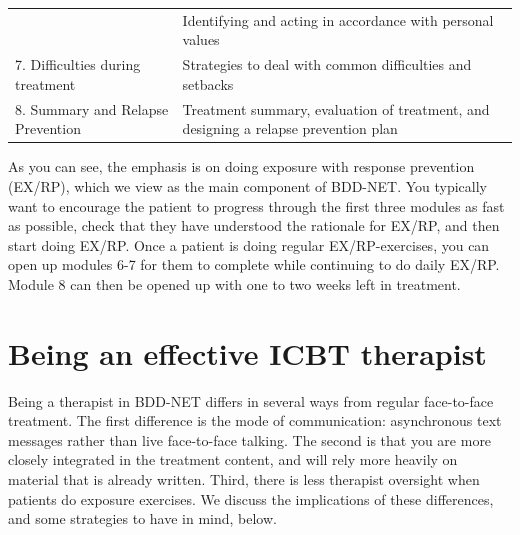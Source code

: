 \documentclass[]{book}
\theoremstyle{definition}
\theoremstyle{definition}
\theoremstyle{definition}
\theoremstyle{remark}
\begin{document}
\begin{longtable}[]{@{}ll@{}}
\begin{minipage}[t]{0.47\columnwidth}
\end{minipage} & \begin{minipage}[t]{0.47\columnwidth}\raggedright
Identifying and acting in accordance with personal values\strut
\end{minipage}\tabularnewline
\begin{minipage}[t]{0.47\columnwidth}\raggedright
7. Difficulties during treatment\strut
\end{minipage} & \begin{minipage}[t]{0.47\columnwidth}\raggedright
Strategies to deal with common difficulties and setbacks\strut
\end{minipage}\tabularnewline
\begin{minipage}[t]{0.47\columnwidth}\raggedright
8. Summary and Relapse Prevention\strut
\end{minipage} & \begin{minipage}[t]{0.47\columnwidth}\raggedright
Treatment summary, evaluation of treatment, and designing a relapse
prevention plan\strut
\end{minipage}\tabularnewline
\bottomrule
\end{longtable}

As you can see, the emphasis is on doing exposure with response
prevention (EX/RP), which we view as the main component of BDD-NET. You
typically want to encourage the patient to progress through the first
three modules as fast as possible, check that they have understood the
rationale for EX/RP, and then start doing EX/RP. Once a patient is doing
regular EX/RP-exercises, you can open up modules 6-7 for them to
complete while continuing to do daily EX/RP. Module 8 can then be opened
up with one to two weeks left in treatment.

\hypertarget{being-an-effective-icbt-therapist-1}{%
\section{Being an effective ICBT
therapist}\label{being-an-effective-icbt-therapist-1}}

Being a therapist in BDD-NET differs in several ways from regular
face-to-face treatment. The first difference is the mode of
communication: asynchronous text messages rather than live face-to-face
talking. The second is that you are more closely integrated in the
treatment content, and will rely more heavily on material that is
already written. Third, there is less therapist oversight when patients
do exposure exercises. We discuss the implications of these differences,
and some strategies to have in mind, below.
\end{document}

